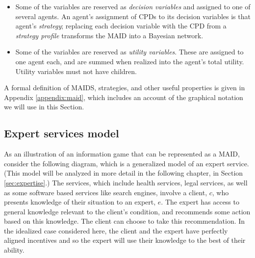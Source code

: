 \documentclass[../thesis.tex]{subfiles}
\begin{document}
\begin{itemize}
\item Some of the variables are reserved as \emph{decision variables}
  and assigned to one of several agents.
  An agent's assignment of CPDs to its decision variables is
  that agent's \emph{strategy}; replacing each decision variable
  with the CPD from a \emph{strategy profile} transforms the MAID
  into a Bayesian network.
\item Some of the variables are reserved as \emph{utility variables}.
  These are assigned to one agent each, and are summed when realized
  into the agent's total utility.
  Utility variables must not have children.
\end{itemize}

A formal definition of MAIDS, strategies, and other useful
properties is given in Appendix \ref{appendix:maid},
which includes an account of the graphical notation we
will use in this Section.

\subsection{Expert services model}
\label{sec:expert-services-ECS}

As an illustration of an information game
that can be represented as a MAID, consider the
following diagram, which is a generalized model of
an expert service. (This model will be analyzed in more detail
in the following chapter, in Section \ref{sec:expertise}.)
The services, which include health services, legal services,
as well as some software based services like search engines,
involve a client, $c$, who presents knowledge of their situation
to an expert, $e$.
The expert has access to general knowledge relevant to the
client's condition, and recommends some action based on
this knowledge.
The client can choose to take this recommendation.
In the idealized case considered here, the client
and the expert have perfectly aligned incentives and
so the expert will use their knowledge to the best
of their ability.

\begin{center}
\end{center}
\end{document}
